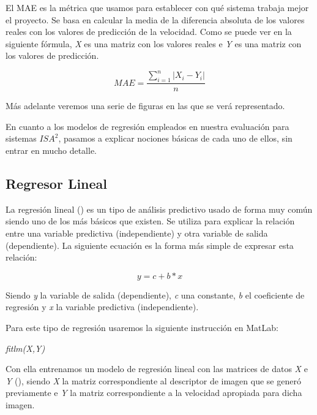 El \ac{MAE} es la métrica que usamos para establecer con qué sistema trabaja mejor el proyecto. Se basa en calcular la media de la diferencia absoluta de los valores reales con los valores de predicción de la velocidad. Como se puede ver en la siguiente fórmula, \textit{X} es una matriz con los valores reales e \textit{Y} es una matriz con los valores de predicción.

\begin{equation}\label{eq:MAE}
MAE = \frac{\sum_{i=1}^{n}|X_i - Y_i|}{n}
\end{equation}

Más adelante veremos una serie de figuras en las que se verá representado.


En cuanto a los modelos de regresión empleados en nuestra evaluación para sistemas $ISA^2$, pasamos a explicar nociones básicas de cada uno de ellos, sin entrar en mucho detalle.
\subsection{Regresor Lineal}

La regresión lineal (\cite{linear}) es un tipo de análisis predictivo usado de forma muy común siendo uno de los más básicos que existen. Se utiliza para explicar la relación entre una variable predictiva (independiente) y otra variable de salida (dependiente). La siguiente ecuación es la forma más simple de expresar esta relación:

\begin{equation}
y = c + b*x
\end{equation}

Siendo \textit{y} la variable de salida (dependiente), \textit{c} una constante, \textit{b} el coeficiente de regresión y \textit{x} la variable predictiva (independiente).

Para este tipo de regresión usaremos la siguiente instrucción en MatLab:

\begin{center}
\textit{fitlm(X,Y)}
\end{center}

Con ella entrenamos un modelo de regresión lineal con las matrices de datos \textit{X} e \textit{Y} (\cite{fitlm}), siendo \textit{X} la matriz correspondiente al descriptor de imagen que se generó previamente e \textit{Y} la matriz correspondiente a la velocidad apropiada para dicha imagen.

